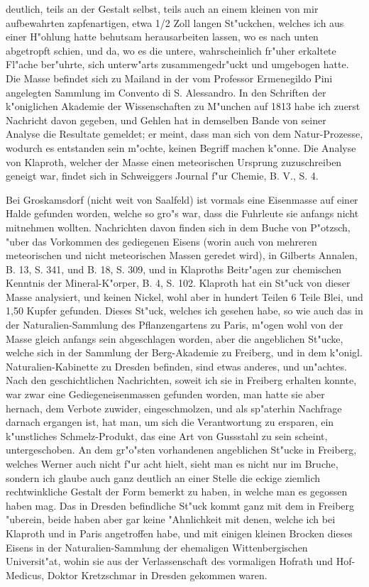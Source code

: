 \documentclass[a4paper, 11pt, oneside, polutonikogreek, german]{article}
\begin{document}
deutlich, teils an der Gestalt selbst, teils auch an einem kleinen von mir aufbewahrten zapfenartigen, etwa 1/2 Zoll langen St"uckchen, welches ich aus einer H"ohlung hatte behutsam herausarbeiten lassen, wo es nach unten abgetropft schien, und da, wo es die untere, wahrscheinlich fr"uher erkaltete Fl"ache ber"uhrte, sich unterw"arts zusammengedr"uckt und umgebogen hatte. Die Masse befindet sich zu Mailand in der vom Professor Ermenegildo Pini angelegten Sammlung im Convento di S. Alessandro. In den Schriften der k"oniglichen Akademie der Wissenschaften zu M"unchen auf 1813 habe ich zuerst Nachricht davon gegeben, und Gehlen hat in demselben Bande von seiner Analyse die Resultate gemeldet; er meint, dass man sich von dem Natur-Prozesse, wodurch es entstanden sein m"ochte, keinen Begriff machen k"onne. Die Analyse von Klaproth, welcher der Masse einen meteorischen Ursprung zuzuschreiben geneigt war, findet sich in Schweiggers Journal f"ur Chemie, B. V., S. 4.

Bei Groskamsdorf (nicht weit von Saalfeld) ist vormals eine Eisenmasse auf einer Halde gefunden worden, welche so gro"s war, dass die Fuhrleute sie anfangs nicht mitnehmen wollten. Nachrichten davon finden sich in dem Buche von P"otzsch, "uber das Vorkommen des gediegenen Eisens (worin auch von mehreren meteorischen und nicht meteorischen Massen geredet wird), in Gilberts Annalen, B. 13, S. 341, und B. 18, S. 309, und in Klaproths Beitr"agen zur chemischen Kenntnis der Mineral-K"orper, B. 4, S. 102. Klaproth hat ein St"uck von dieser Masse analysiert, und keinen Nickel, wohl aber in hundert Teilen 6 Teile Blei, und 1,50 Kupfer gefunden. Dieses St"uck, welches ich gesehen habe, so wie auch das in der Naturalien-Sammlung des Pflanzengartens zu Paris, m"ogen wohl von der Masse gleich anfangs sein abgeschlagen worden, aber die angeblichen St"ucke, welche sich in der Sammlung der Berg-Akademie zu Freiberg, und in dem k"onigl. Naturalien-Kabinette zu Dresden befinden, sind etwas anderes, und un"achtes. Nach den geschichtlichen Nachrichten, soweit ich sie in Freiberg erhalten konnte, war zwar eine Gediegeneisenmassen gefunden worden, man hatte sie aber hernach, dem Verbote zuwider, eingeschmolzen, und als sp"aterhin Nachfrage darnach ergangen ist, hat man, um sich die Verantwortung zu ersparen, ein k"unstliches Schmelz-Produkt, das eine Art von Gussstahl zu sein scheint, untergeschoben. An dem gr"o"sten vorhandenen angeblichen St"ucke in Freiberg, welches Werner auch nicht f"ur acht hielt, sieht man es nicht nur im Bruche, sondern ich glaube auch ganz deutlich an einer Stelle die eckige ziemlich rechtwinkliche Gestalt der Form bemerkt zu haben, in welche man es gegossen haben mag. Das in Dresden befindliche St"uck kommt ganz mit dem in Freiberg "uberein, beide haben aber gar keine "Ahnlichkeit mit denen, welche ich bei Klaproth und in Paris angetroffen habe, und mit einigen kleinen Brocken dieses Eisens in der Naturalien-Sammlung der ehemaligen Wittenbergischen Universit"at, wohin sie aus der Verlassenschaft des vormaligen Hofrath und Hof-Medicus, Doktor Kretzschmar in Dresden gekommen waren.
\end{document}

